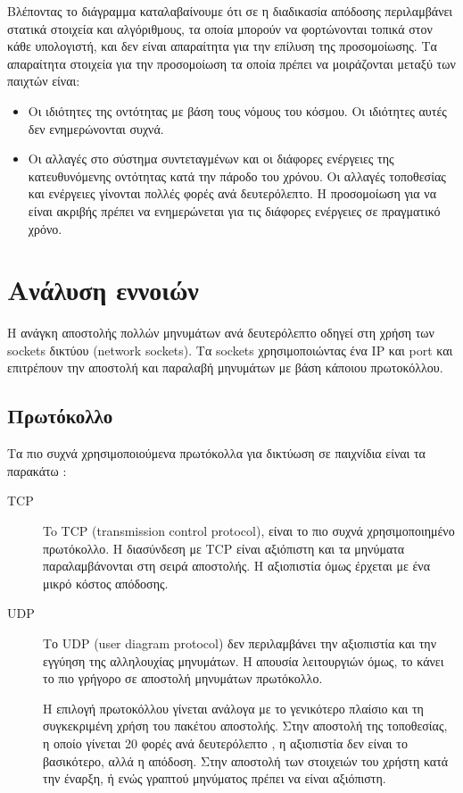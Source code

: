 		Βλέποντας το διάγραμμα καταλαβαίνουμε ότι σε η διαδικασία απόδοσης περιλαμβάνει στατικά στοιχεία και αλγόριθμους, τα οποία μπορούν να φορτώνονται τοπικά στον κάθε υπολογιστή, και δεν είναι απαραίτητα για την επίλυση της προσομοίωσης. Τα απαραίτητα στοιχεία για την προσομοίωση τα οποία πρέπει να μοιράζονται μεταξύ των παιχτών είναι:
		\begin{itemize}
			\item Oι ιδιότητες της οντότητας με βάση τους νόμους του κόσμου. Οι ιδιότητες αυτές δεν ενημερώνονται συχνά.
			\item Οι αλλαγές στο σύστημα συντεταγμένων και οι διάφορες ενέργειες της κατευθυνόμενης οντότητας κατά την πάροδο του χρόνου. Οι αλλαγές τοποθεσίας και ενέργειες γίνονται πολλές φορές ανά δευτερόλεπτο. Η προσομοίωση για να είναι ακριβής πρέπει να ενημερώνεται για τις διάφορες ενέργειες σε πραγματικό χρόνο.
		\end{itemize}
				
		\section{Ανάλυση εννοιών}	
		Η ανάγκη αποστολής πολλών μηνυμάτων ανά δευτερόλεπτο οδηγεί στη χρήση των sockets δικτύου (network sockets). Τα sockets χρησιμοποιώντας ένα \gls{IP} και \gls{port} και επιτρέπουν την αποστολή και παραλαβή μηνυμάτων με βάση κάποιου πρωτοκόλλου.
		
		\subsection{Πρωτόκολλο}
		Τα πιο συχνά χρησιμοποιούμενα πρωτόκολλα για δικτύωση σε παιχνίδια είναι τα παρακάτω \cite{sanja14}:
		\begin{description}	
			\item [TCP] To TCP (transmission control protocol), είναι το πιο συχνά χρησιμοποιημένο πρωτόκολλο. Η διασύνδεση με TCP είναι αξιόπιστη και τα μηνύματα παραλαμβάνονται στη σειρά αποστολής. Η αξιοπιστία όμως έρχεται με ένα μικρό κόστος απόδοσης.
			\item [UDP] Το UDP (user diagram protocol) δεν περιλαμβάνει την αξιοπιστία και την εγγύηση της αλληλουχίας μηνυμάτων. Η απουσία λειτουργιών όμως, το κάνει το πιο γρήγορο σε αποστολή μηνυμάτων πρωτόκολλο.
			
			Η επιλογή πρωτοκόλλου γίνεται ανάλογα με το γενικότερο πλαίσιο και τη συγκεκριμένη χρήση του πακέτου αποστολής. Στην αποστολή της τοποθεσίας, η οποίο γίνεται 20 φορές ανά δευτερόλεπτο \cite{networkthomson}, η αξιοπιστία δεν είναι το βασικότερο, αλλά η απόδοση. Στην αποστολή των στοιχειών του χρήστη κατά την έναρξη, ή ενώς γραπτού μηνύματος πρέπει να είναι αξιόπιστη.
		\end{description}


